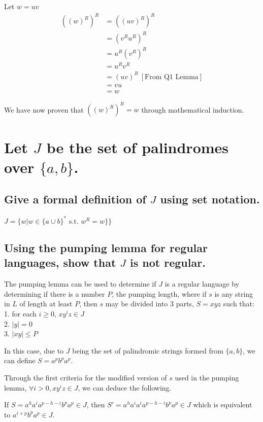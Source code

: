 \documentclass{article}
\begin{document}
Let $w = uv$
\begin{align*}
    ((w)^R)^R & = ((uv)^R)^R                      \\
              & = (v^R u^R)^R                     \\
              & = u^R (v^R)^R                     \\
              & = u^R v^R                         \\
              & = (uv)^R \ [\text{From Q1 Lemma}] \\
              & =vu                               \\
              & = w
\end{align*}

We have now proven that $((w)^R)^R = w$ through mathematical induction.
\section{Let $J$ be the set of palindromes over $\{a,b\}$.}

\subsection{Give a formal definition of $J$ using set notation.}

$J = \{w | w \in \{a \cup b\}^* \text{ s.t. } w^R = w\}\}$

\subsection{Using the pumping lemma for regular languages, show that $J$ is not regular.}

The pumping lemma can be used to determine if $J$ is a regular language by determining if there is a number $P$, the pumping length, where if $s$ is any string in $L$ of length at least $P$, then $s$ may be divided into 3 parts, $S=xyz$ such that: \\
1. for each $i \ge 0$, $xy^iz \in J$ \\
2. $|y| = 0$ \\
3. $|xy| \le P$


In this case, due to $J$ being the set of palindromic strings formed from $\{a, b\}$, we can define $S = a^p b^p a^p$.


Through the first criteria for the modified version of $s$ used in the pumping lemma, $\forall i > 0, xy^iz \in J$, we can deduce the following.

If $S = a^h a^i a^{p-h-i} b^p a^p \in J$, then $S' = a^h a^i a^i a^{p-h-i} b^p a^p \in J$ which is equivalent to $a^{i+p} b^p a^p \in J$.
\end{document}
